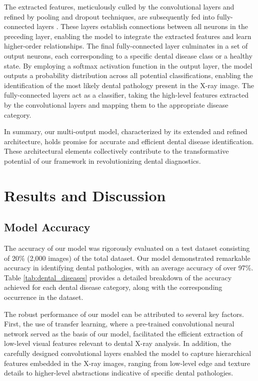 \documentclass[journal,twoside,web]{ieeecolor}
\begin{document}
The extracted features, meticulously culled by the convolutional layers and refined by pooling and dropout techniques, are subsequently fed into fully-connected layers \cite{bishop2006pattern}. These layers establish connections between all neurons in the preceding layer, enabling the model to integrate the extracted features and learn higher-order relationships. The final fully-connected layer culminates in a set of output neurons, each corresponding to a specific dental disease class or a healthy state. By employing a softmax activation function in the output layer, the model outputs a probability distribution across all potential classifications, enabling the identification of the most likely dental pathology present in the X-ray image. The fully-connected layers act as a classifier, taking the high-level features extracted by the convolutional layers and mapping them to the appropriate disease category.

In summary, our multi-output model, characterized by its extended and refined architecture, holds promise for accurate and efficient dental disease identification. These architectural elements collectively contribute to the transformative potential of our framework in revolutionizing dental diagnostics.


\section{Results and Discussion}

\subsection{Model Accuracy}

The accuracy of our model was rigorously evaluated on a test dataset consisting of 20\% (2,000 images) of the total dataset. Our model demonstrated remarkable accuracy in identifying dental pathologies, with an average accuracy of over 97\%. Table \ref{tab:dental_diseases} provides a detailed breakdown of the accuracy achieved for each dental disease category, along with the corresponding occurrence in the dataset.

The robust performance of our model can be attributed to several key factors. First, the use of transfer learning, where a pre-trained convolutional neural network served as the basis of our model, facilitated the efficient extraction of low-level visual features relevant to dental X-ray analysis. In addition, the carefully designed convolutional layers enabled the model to capture hierarchical features embedded in the X-ray images, ranging from low-level edge and texture details to higher-level abstractions indicative of specific dental pathologies.
\end{document}
